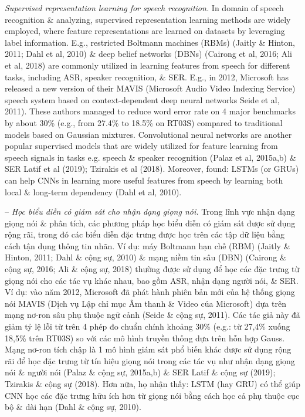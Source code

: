 \documentclass{article}
\begin{document}
\begin{itemize}
\begin{itemize}
\begin{itemize}
            {\it Supervised representation learning for speech recognition.} In domain of speech recognition \& analyzing, supervised representation learning methods are widely employed, where feature representations are learned on datasets by leveraging label information. E.g., restricted Boltmann machines (RBMs) (Jaitly \& Hinton, 2011; Dahl et al, 2010) \& deep belief networks (DBNs) (Cairong et al, 2016; Ali et al, 2018) are commonly utilized in learning features from speech for different tasks, including ASR, speaker recognition, \& SER. E.g., in 2012, Microsoft has released a new version of their MAVIS (Microsoft Audio Video Indexing Service) speech system based on context-dependent deep neural networks Seide et al, 2011). These authors managed to reduce word error rate on 4 major benchmarks by about 30\% (e.g., from 27.4\% to 18.5\% on RT03S) compared to traditional models based on Gaussian mixtures. Convolutional neural networks are another popular supervised models that are widely utilized for feature learning from speech signals in tasks e.g. speech \& speaker recognition (Palaz et al, 2015a,b) \& SER Latif et al (2019); Tzirakis et al (2018). Moreover, found: LSTMs (or GRUs) can help CNNs in learning more useful features from speech by learning both local \& long-term dependency (Dahl et al, 2010).

            -- {\it Học biểu diễn có giám sát cho nhận dạng giọng nói.} Trong lĩnh vực nhận dạng giọng nói \& phân tích, các phương pháp học biểu diễn có giám sát được sử dụng rộng rãi, trong đó các biểu diễn đặc trưng được học trên các tập dữ liệu bằng cách tận dụng thông tin nhãn. Ví dụ: máy Boltmann hạn chế (RBM) (Jaitly \& Hinton, 2011; Dahl \& cộng sự, 2010) \& mạng niềm tin sâu (DBN) (Cairong \& cộng sự, 2016; Ali \& cộng sự, 2018) thường được sử dụng để học các đặc trưng từ giọng nói cho các tác vụ khác nhau, bao gồm ASR, nhận dạng người nói, \& SER. Ví dụ: vào năm 2012, Microsoft đã phát hành phiên bản mới của hệ thống giọng nói MAVIS (Dịch vụ Lập chỉ mục Âm thanh \& Video của Microsoft) dựa trên mạng nơ-ron sâu phụ thuộc ngữ cảnh (Seide \& cộng sự, 2011). Các tác giả này đã giảm tỷ lệ lỗi từ trên 4 phép đo chuẩn chính khoảng 30\% (e.g.: từ 27,4\% xuống 18,5\% trên RT03S) so với các mô hình truyền thống dựa trên hỗn hợp Gauss. Mạng nơ-ron tích chập là 1 mô hình giám sát phổ biến khác được sử dụng rộng rãi để học đặc trưng từ tín hiệu giọng nói trong các tác vụ như nhận dạng giọng nói \& người nói (Palaz \& cộng sự, 2015a,b) \& SER Latif \& cộng sự (2019); Tzirakis \& cộng sự (2018). Hơn nữa, họ nhận thấy: LSTM (hay GRU) có thể giúp CNN học các đặc trưng hữu ích hơn từ giọng nói bằng cách học cả phụ thuộc cục bộ \& dài hạn (Dahl \& cộng sự, 2010).


\end{itemize}
\end{itemize}
\end{itemize}
\end{document}
